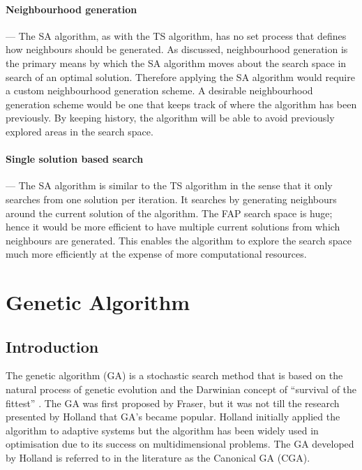 \paragraph{Neighbourhood generation}
--- The \gls{SA} algorithm, as with the \gls{TS} algorithm, has no set process that defines how neighbours should be generated. As discussed, neighbourhood generation is the primary means by which the \gls{SA} algorithm moves about the search space in search of an optimal solution. Therefore applying the \gls{SA} algorithm would require a custom neighbourhood generation scheme. A desirable neighbourhood generation scheme would be one that keeps track of where the algorithm has been previously. By keeping history, the algorithm will be able to avoid previously explored areas in the search space.
\paragraph{Single solution based search}
--- The \gls{SA} algorithm is similar to the \gls{TS} algorithm in the sense that it only searches from one solution per iteration. It searches by generating neighbours around the current solution of the algorithm. The \gls{FAP} search space is huge; hence it would be more efficient to have multiple current solutions from which neighbours are generated. This enables the algorithm to explore the search space much more efficiently at the expense of more computational resources.

\section{Genetic Algorithm}
\label{sec:geneticalgorithm}
\subsection{Introduction}
The genetic algorithm (GA) is a stochastic search method that is based on the natural process of genetic evolution and the Darwinian concept of ``survival of the fittest'' \cite{DistributedHierarchicalGA,AcceleratingGA,AdaptiveSAGA,FamilyGA}. The \gls{GA} was first proposed by Fraser, but it was not till the research presented by Holland that \gls{GA}'s became popular\cite{CompuIntelligenceIntro}. Holland initially applied the algorithm to adaptive systems but the algorithm has been widely used in optimisation due to its success on multidimensional problems\cite{ParallelGASA,DistributedHierarchicalGA,FamilyGA}. The \gls{GA} developed by Holland is referred to in the literature as the Canonical \gls{GA} (CGA)\cite{CompuIntelligenceIntro}.

